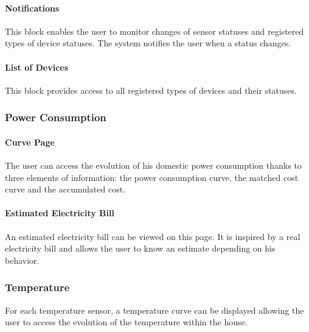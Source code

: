    \paragraph{Notifications}
    This block enables the user to monitor changes of sensor statuses and registered types of device statuses. The system notifies the user when a status changes.
    \paragraph{List of Devices} %
    This block provides access to all registered types of devices and their statuses.

\subsubsection{Power Consumption}

    \paragraph{Curve Page}
    The user can access the evolution of his domestic power consumption thanks to three elements of information: the power consumption curve, the matched cost curve and the accumulated cost.
    
    \paragraph{Estimated Electricity Bill}
    An estimated electricity bill can be viewed on this page. It is inspired by a real electricity bill and allows the user to know an estimate depending on his behavior.
\subsubsection{Temperature}
    For each temperature sensor, a temperature curve can be displayed allowing the user to access the evolution of the temperature within the house. 
